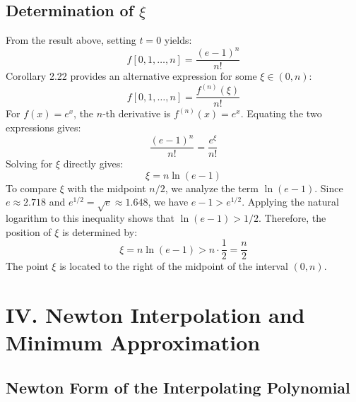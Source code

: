 \documentclass[a4paper]{article}
\begin{document}
\subsection*{Determination of $\xi$}

From the result above, setting $t=0$ yields:
\[
f[0, 1, \dots, n] = \frac{(e-1)^n}{n!}
\]
Corollary 2.22 provides an alternative expression for some $\xi \in (0, n)$:
\[
f[0, 1, \dots, n] = \frac{f^{(n)}(\xi)}{n!}
\]
For $f(x)=e^x$, the $n$-th derivative is $f^{(n)}(x)=e^x$. Equating the two expressions gives:
\[
\frac{(e-1)^n}{n!} = \frac{e^\xi}{n!}
\]
Solving for $\xi$ directly gives:
\[
\xi = n \ln(e-1)
\]
To compare $\xi$ with the midpoint $n/2$, we analyze the term $\ln(e-1)$.
Since $e \approx 2.718$ and $e^{1/2} = \sqrt{e} \approx 1.648$, we have $e-1 > e^{1/2}$.
Applying the natural logarithm to this inequality shows that $\ln(e-1) > 1/2$.
Therefore, the position of $\xi$ is determined by:
\[
\xi = n \ln(e-1) > n \cdot \frac{1}{2} = \frac{n}{2}
\]
The point $\xi$ is located to the right of the midpoint of the interval $(0,n)$.


\section*{IV. Newton Interpolation and Minimum Approximation}

\subsection*{Newton Form of the Interpolating Polynomial}
\end{document}
